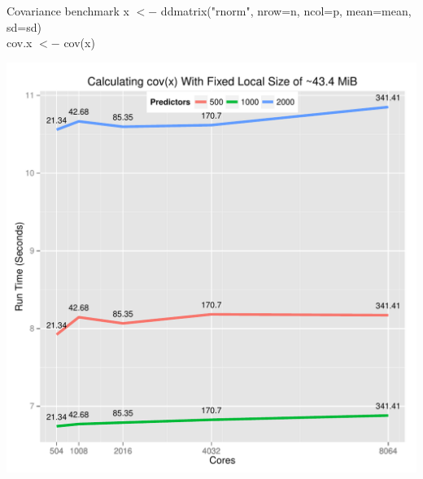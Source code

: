 \begin{frame}
  \begin{block}{Covariance benchmark}
    \scriptsize
      x $<-$ ddmatrix("rnorm", nrow=n, ncol=p, mean=mean, sd=sd) \\
      cov.x $<-$ cov(x)
      \begin{center}
        \includegraphics[trim=3mm 1mm 2mm 11mm,clip,height=.78\textheight]{../common/pics/cov}
      \end{center}
  \end{block}
\end{frame}

